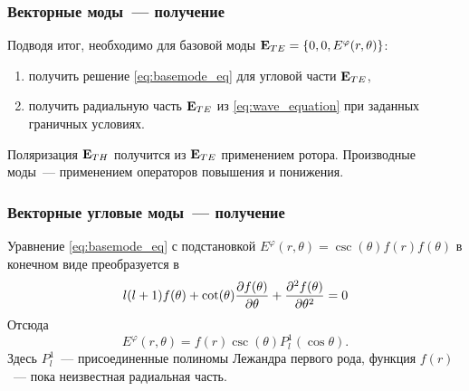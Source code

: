 \documentclass[compress]{beamer}
\begin{document}
    \begin{frame}\frametitle{Векторные моды~--- получение}

        Подводя итог, необходимо для базовой моды $\vb{E}_{TE} = \qty{0, 0, E^\varphi(r,\theta)}$:
        \begin{enumerate}
            \item получить решение \autoref{eq:basemode_eq} для угловой части $\vb{E}_{TE}$,
            \item получить радиальную часть $\vb{E}_{TE}$ из \autoref{eq:wave_equation} при заданных граничных условиях.
        \end{enumerate}

        Поляризация $\vb{E}_{TH}$ получится из $\vb{E}_{TE}$ применением ротора. Производные моды~--- применением операторов повышения и понижения.

    \end{frame}


    \begin{frame}\frametitle{Векторные угловые моды~--- получение}

        Уравнение \autoref{eq:basemode_eq} с подстановкой $E^\varphi(r,\theta) = \csc(\theta) f(r) f(\theta)$ в конечном виде преобразуется в
        \begin{equation*}
            l (l + 1) f(\theta)
            + \cot(\theta) \pdv{f(\theta)}{\theta}
            + \pdv[2]{f(\theta)}{\theta} = 0
        \end{equation*}
        Отсюда
        \begin{equation}\label{eq:angle_modes_vect}
            E^\varphi(r,\theta) = f(r) \csc(\theta) P^1_l(\cos\theta) .
        \end{equation}
        Здесь $P^1_l$~--- присоединенные полиномы Лежандра первого рода, функция $f(r)$~--- пока неизвестная радиальная часть.

    \end{frame}

\end{document}
